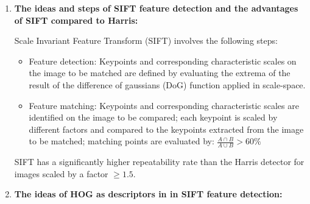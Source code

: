 \documentclass[a4paper]{article}
\begin{document}
\begin{enumerate}
        \item \textbf{The ideas and steps of SIFT feature detection and the 
        advantages of SIFT compared to Harris:}
        
        Scale Invariant Feature Transform (SIFT) involves the following steps:
        \begin{itemize}
                \item Feature detection: Keypoints and corresponding characteristic scales on the image to be matched are defined by evaluating the extrema of the result of the difference of gaussians (DoG) function applied in scale-space.
                \item Feature matching: Keypoints and corresponding characteristic scales are identified on the image to be compared; 
                each keypoint is scaled by different factors and compared to the keypoints extracted from the image to be matched; 
                matching points are evaluated by: $\frac{A \cap B}{A \cup B} > 60\%$
        \end{itemize}

        SIFT has a significantly higher repeatability rate than the Harris detector for images scaled by a factor $\ge1.5$.

        \item \textbf{The ideas of HOG as descriptors in in SIFT feature detection:}

\end{enumerate}


\pagebreak


 
\end{document}
